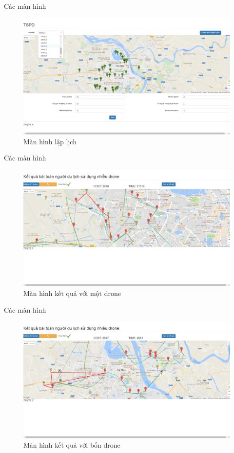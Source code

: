 \documentclass[compress]{beamer}
\begin{document}
\begin{frame}{Các màn hình}
\begin{figure}

\includegraphics[scale=0.25]{screen/laplich.png}
\caption{Màn hình lập lịch}
\label{laplich}
\end{figure}
\end{frame}
\begin{frame}{Các màn hình}
\begin{figure}

\includegraphics[scale=0.25]{screen/solution1.png}
\caption{Màn hình kết quả với một drone}
\label{solution1}
\end{figure}
\end{frame}
\begin{frame}{Các màn hình}
\begin{figure}

\includegraphics[scale=0.25]{screen/solution2.png}
\caption{Màn hình kết quả với bốn drone}
\label{solution2}
\end{figure}
\end{frame}
\end{document}
